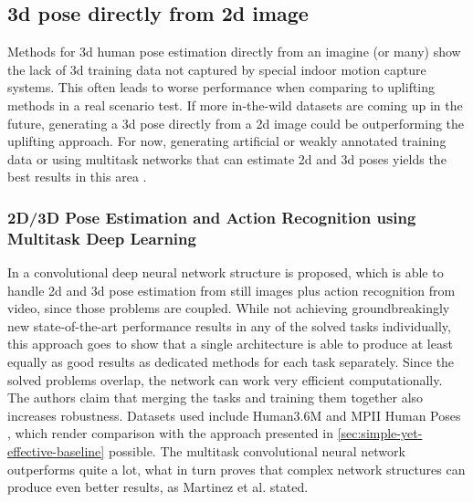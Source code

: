 \subsection{3d pose directly from 2d image}
Methods for 3d human pose estimation directly from an imagine (or many) show the lack of 3d training data not captured by special indoor motion capture systems. This often leads to worse performance when comparing to uplifting methods in a real scenario test. If more in-the-wild datasets are coming up in the future, generating a 3d pose directly from a 2d image could be outperforming the uplifting approach. For now, generating artificial or weakly annotated training data or using multitask networks that can estimate 2d and 3d poses yields the best results in this area \cite{wang_deep_2021}.
\subsubsection{2D/3D Pose Estimation and Action Recognition using Multitask Deep Learning}
In \cite{Luvizon2018} a convolutional deep neural network structure is proposed, which is able to handle 2d and 3d pose estimation from still images plus action recognition from video, since those problems are coupled. While not achieving groundbreakingly new state-of-the-art performance results in any of the solved tasks individually, this approach goes to show that a single architecture is able to produce at least equally as good results as dedicated methods for each task separately. Since the solved problems overlap, the network can work very efficient computationally. The authors claim that merging the tasks and training them together also increases robustness. Datasets used include Human3.6M \cite{H3.6M} and MPII Human Poses \cite{andriluka14cvpr}, which render comparison with the approach presented in \autoref{sec:simple-yet-effective-baseline} possible. The multitask convolutional neural network outperforms \cite{Martinez_2017_ICCV} quite a lot, what in turn proves that complex network structures can produce even better results, as Martinez et al. stated.
